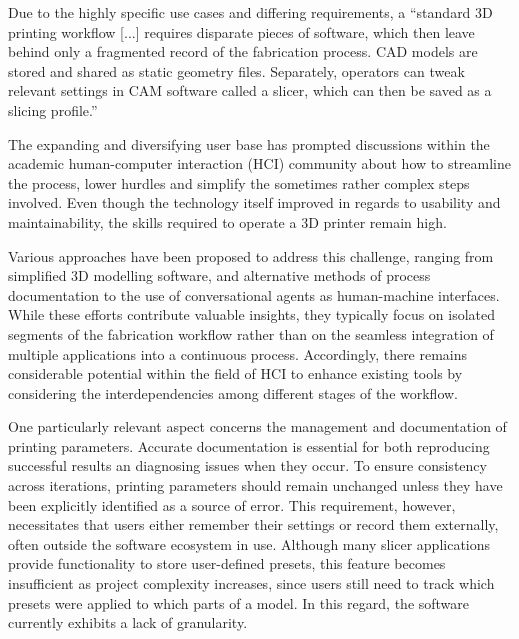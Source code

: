 Due to the highly specific use cases and differing requirements, a ``standard 3D printing workflow [...] requires disparate pieces of software, which then leave behind only a fragmented record of the fabrication process. CAD models are stored and shared as static geometry files. Separately, operators can tweak relevant settings in CAM software called a slicer, which can then be saved as a slicing profile.''\cite{subbaraman_shape_2025}

The expanding and diversifying user base has prompted discussions within the academic human-computer interaction (HCI) community about how to streamline the process, lower hurdles and simplify the sometimes rather complex steps involved.
Even though the technology itself improved in regards to usability and maintainability, the skills required to operate a 3D printer remain high.\cite{jasche_printassistconversational_2023}

Various approaches have been proposed to address this challenge, ranging from simplified 3D modelling software\cite{buehler_abc_2014}, and alternative methods of process documentation\cite{subbaraman_shape_2025} to the use of conversational agents as human-machine interfaces.\cite{jasche_printassistconversational_2023}
While these efforts contribute valuable insights, they typically focus on isolated segments of the fabrication workflow rather than on the seamless integration of multiple applications into a continuous process.
Accordingly, there remains considerable potential within the field of HCI to enhance existing tools by considering the interdependencies among different stages of the workflow.

One particularly relevant aspect concerns the management and documentation of printing parameters.
Accurate documentation is essential for both reproducing successful results an diagnosing issues when they occur.
To ensure consistency across iterations, printing parameters should remain unchanged unless they have been explicitly identified as a source of error.
This requirement, however, necessitates that users either remember their settings or record them externally, often outside the software ecosystem in use.
Although many slicer applications provide functionality to store user-defined presets, this feature becomes insufficient as project complexity increases, since users still need to track which presets were applied to which parts of a model.
In this regard, the software currently exhibits a lack of granularity.

